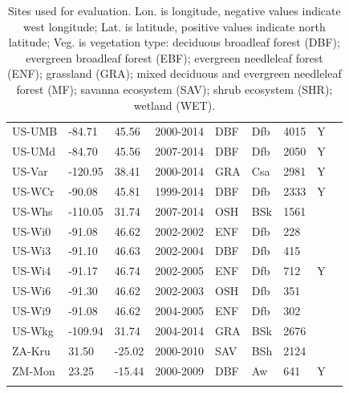 \documentclass{myreport}
\begin{document}
\begin{longtable}{lllllllll}
  US-UMB & -84.71 & 45.56 & 2000-2014 & DBF & Dfb & 4015 & Y & \citet{US-UMB} \\ 
  US-UMd & -84.70 & 45.56 & 2007-2014 & DBF & Dfb & 2050 & Y & \citet{US-UMd} \\ 
  US-Var & -120.95 & 38.41 & 2000-2014 & GRA & Csa & 2981 & Y & \citet{US-Var} \\ 
  US-WCr & -90.08 & 45.81 & 1999-2014 & DBF & Dfb & 2333 & Y & \citet{US-WCr} \\ 
  US-Whs & -110.05 & 31.74 & 2007-2014 & OSH & BSk & 1561 &  & \citet{US-Whs} \\ 
  US-Wi0 & -91.08 & 46.62 & 2002-2002 & ENF & Dfb & 228 &  & \citet{US-Wi0} \\ 
  US-Wi3 & -91.10 & 46.63 & 2002-2004 & DBF & Dfb & 415 &  & \citet{US-Wi3} \\ 
  US-Wi4 & -91.17 & 46.74 & 2002-2005 & ENF & Dfb & 712 & Y & \citet{US-Wi4} \\ 
  US-Wi6 & -91.30 & 46.62 & 2002-2003 & OSH & Dfb & 351 &  & \citet{US-Wi6} \\ 
  US-Wi9 & -91.08 & 46.62 & 2004-2005 & ENF & Dfb & 302 &  & \citet{US-Wi9} \\ 
  US-Wkg & -109.94 & 31.74 & 2004-2014 & GRA & BSk & 2676 &  & \citet{US-Wkg} \\ 
  ZA-Kru & 31.50 & -25.02 & 2000-2010 & SAV & BSh & 2124 &  & \citet{ZA-Kru} \\ 
  ZM-Mon & 23.25 & -15.44 & 2000-2009 & DBF & Aw & 641 & Y & \citet{ZM-Mon} \\ 
  \bottomrule
\caption{Sites used for evaluation. Lon. is longitude, negative values indicate west longitude; Lat. is latitude, positive values indicate north latitude; Veg. is vegetation type: deciduous broadleaf forest (DBF); evergreen broadleaf forest (EBF); evergreen needleleaf forest (ENF); grassland (GRA); mixed deciduous and evergreen needleleaf forest (MF); savanna ecosystem (SAV); shrub ecosystem (SHR); wetland (WET).} 
\label{tab:sites}
\end{longtable}


\end{document}
